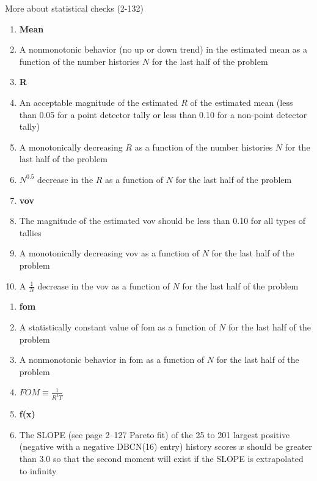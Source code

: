 \documentclass[aspectratio=1610,pdftex,dvipsnames,compress,xcolor={dvipsnames}]{beamer}
\newcommand{\acs}{\acrshort} %
\begin{document}
\begin{frame}{More about statistical checks (2-132)}
    \begin{enumerate}[series=checks,topsep=0pt,itemsep=5pt,leftmargin=*,label=(\arabic*)]
        \item[]\textbf{Mean}
        \item A nonmonotonic behavior (no up or down trend) in the estimated mean as a function of the number histories $N$ for the last half of the problem
            \vspace{0.10in}
        \item[]\textbf{R}
        \item An acceptable magnitude of the estimated $R$ of the estimated mean (less than 0.05 for a point detector tally or less than 0.10 for a non-point detector tally)
        \item A monotonically decreasing $R$ as a function of the number histories $N$ for the last half of the problem
        \item $N^{0.5}$ decrease in the $R$ as a function of $N$ for the last half of the problem
            \vspace{0.10in}
        \item[]\textbf{\acs{vov}}
        \item The magnitude of the estimated \acs{vov} should be less than 0.10 for all types of tallies
        \item A monotonically decreasing \acs{vov} as a function of $N$ for the last half of the problem
        \item A $\frac{1}{N}$ decrease in the \acs{vov} as a function of $N$ for the last half of the problem
    \end{enumerate}
\end{frame}


\begin{frame}[t]{}
    \begin{enumerate}[resume=checks,topsep=0pt,itemsep=5pt,leftmargin=*,label=(\arabic*)]
        \item[]\textbf{\acs{fom}}
        \item A statistically constant value of \acs{fom} as a function of $N$ for the last half of the problem
        \item A nonmonotonic behavior in \acs{fom} as a function of $N$ for the last half of the problem
        \item[] $FOM \equiv \frac{1}{R^2 T}$
            \vspace{0.10in}
        \item[]\textbf{f(x)}
        \item The SLOPE (see page 2–127 Pareto fit) of the 25 to 201 largest positive (negative with a negative DBCN(16) entry) history scores $x$ should be greater than 3.0 so that the second moment will exist if the SLOPE is extrapolated to infinity
    \end{enumerate}
\end{frame}
\end{document}
